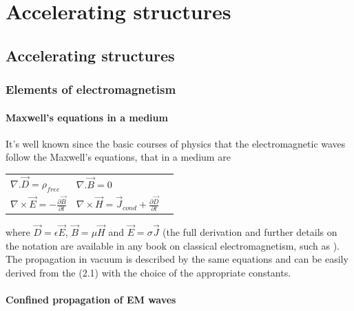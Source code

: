 

\chapter[Accelerating structures]{Accelerating structures}

\section[Accelerating structures]{Accelerating structures}

\subsection[Elements of electromagnetism]{Elements of electromagnetism}

\subsubsection{Maxwell's equations in a medium}

It's well known since the basic courses of physics that the electromagnetic waves follow the Maxwell's equations, that in a medium are

\begin{center}
\begin{tabular}{ l l r }
$\nabla . \vec{D} = \rho_{free}$			\hspace{10mm}				&	$\nabla . \vec{B} = 0	$	& \hspace{10mm} \multirow{2}{*}{(2.1)}\\
$\nabla \times \vec{E} = - \frac{\partial \vec{B}}{\partial t}$		&	$\nabla \times \vec{H} = \vec{J}_{cond} + \frac{\partial \vec{D}}{\partial t}	$ &\\
\end{tabular}
\end{center}
where $\vec{D} = \epsilon \vec{E}$, $\vec{B} = \mu \vec{H}$ and $\vec{E} = \sigma \vec{J}$ (the full derivation and further details on the notation are available in any book on classical electromagnetism, such as \cite{Botta:EM, Jackson:ClassEM}). The propagation in vacuum is described by the same equations and can be easily derived from the (2.1) with the choice of the appropriate constants.

\subsubsection{Confined propagation of EM waves}


